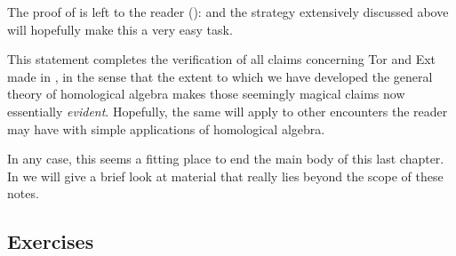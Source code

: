 The proof of  is left to the reader
():
 and the strategy extensively discussed
above will hopefully make this a very easy task.

This statement completes the verification of all claims concerning Tor
and Ext made in , in the sense that the extent to
which we have developed the general theory of homological algebra
makes those seemingly magical claims now essentially \emph{evident}.
Hopefully, the same will apply to other encounters the reader may have
with simple applications of homological algebra.

In any case, this seems a fitting place to end the main body of this
last chapter. In  we will give a
brief look at material that really lies beyond the scope of these
notes.

\subsection*{Exercises}

